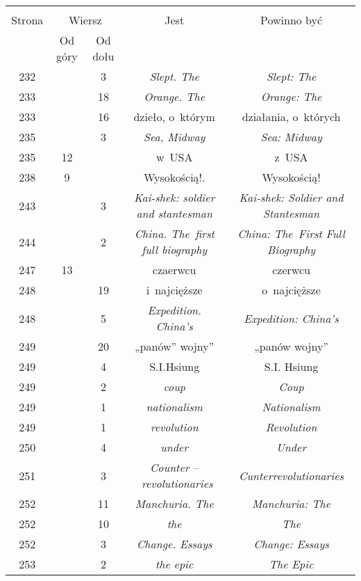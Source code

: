 \documentclass[a4paper,11pt]{article}
\begin{document}
\begin{center}
  \begin{tabular}{|c|c|c|c|c|}
    \hline
    & \multicolumn{2}{c|}{} & & \\
    Strona & \multicolumn{2}{c|}{Wiersz} & Jest
                              & Powinno być \\ \cline{2-3}
    & Od góry & Od dołu & & \\
    \hline
    232 & &  3 & \emph{Slept. The} & \emph{Slept: The} \\
    233 & & 18 & \emph{Orange. The} & \emph{Orange: The} \\
    233 & & 16 & dzieło, o~którym & działania, o~których \\
    235 & &  3 & \emph{Sea, Midway} & \emph{Sea: Midway} \\
    235 & 12 & & w~USA & z~USA \\
    238 &  9 & & Wysokością!. & Wysokością! \\
    243 & &  3 & \emph{Kai-shek: soldier and stantesman}
           & \emph{Kai-shek: Soldier and Stantesman} \\
    244 & &  2 & \emph{China. The~first full biography}
           & \emph{China: The~First Full Biography} \\
    247 & 13 & & czaerwcu & czerwcu \\
    248 & & 19 & i~najcięższe & o~najcięższe \\
    248 & &  5 & \emph{Expedition. China's} & \emph{Expedition: China's} \\
    249 & & 20 & „panów” wojny” & „panów wojny” \\
    249 & &  4 & S.I.Hsiung & S.I. Hsiung \\
    249 & &  2 & \emph{coup} & \emph{Coup} \\
    249 & &  1 & \emph{nationalism} & \emph{Nationalism} \\
    249 & &  1 & \emph{revolution} & \emph{Revolution} \\
    250 & &  4 & \emph{under} & \emph{Under} \\
    251 & &  3 & \emph{Counter --~revolutionaries}
           & \emph{Cunterrevolutionaries} \\
    252 & & 11 & \emph{Manchuria. The} & \emph{Manchuria: The} \\
    252 & & 10 & \emph{the} & \emph{The} \\
    252 & &  3 & \emph{Change. Essays} & \emph{Change: Essays} \\
    253 & &  2 & \emph{the epic} & \emph{The Epic} \\

\end{tabular}
\end{center}
\end{document}
